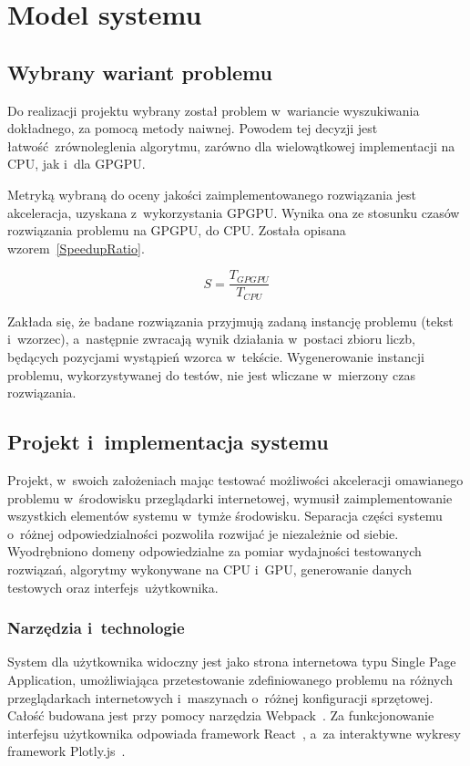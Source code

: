 
\section{Model systemu}

\subsection{Wybrany wariant problemu}

Do realizacji projektu wybrany został problem w~wariancie wyszukiwania dokładnego, za pomocą metody naiwnej. Powodem tej decyzji jest łatwość zrównoleglenia algorytmu, zarówno dla wielowątkowej implementacji na CPU, jak i~dla GPGPU.

Metryką wybraną do oceny jakości zaimplementowanego rozwiązania jest akceleracja, uzyskana z~wykorzystania GPGPU. Wynika ona ze stosunku czasów rozwiązania problemu na GPGPU, do CPU. Została opisana wzorem~\ref{SpeedupRatio}.

\begin{equation}
    \label{SpeedupRatio}
    S=\frac{T_{GPGPU}}{T_{CPU}}
\end{equation}

Zakłada się, że badane rozwiązania przyjmują zadaną instancję problemu (tekst i~wzorzec), a~następnie zwracają wynik działania w~postaci zbioru liczb, będących pozycjami wystąpień wzorca w~tekście. Wygenerowanie instancji problemu, wykorzystywanej do testów, nie jest wliczane w~mierzony czas rozwiązania.

\subsection{Projekt i~implementacja systemu}

Projekt, w~swoich założeniach mając testować możliwości akceleracji omawianego problemu w~środowisku przeglądarki internetowej, wymusił zaimplementowanie wszystkich elementów systemu w~tymże środowisku. Separacja części systemu o~różnej odpowiedzialności pozwoliła rozwijać je niezależnie od siebie.
Wyodrębniono domeny odpowiedzialne za pomiar wydajności testowanych rozwiązań, algorytmy wykonywane na CPU i~GPU, generowanie danych testowych oraz \mbox{interfejs użytkownika.}

\subsubsection{Narzędzia i~technologie}

System dla użytkownika widoczny jest jako strona internetowa typu Single Page Application, umożliwiająca przetestowanie zdefiniowanego problemu na różnych przeglądarkach internetowych i~maszynach o~różnej konfiguracji sprzętowej. Całość budowana jest przy pomocy narzędzia Webpack~\cite{Webpack}. Za funkcjonowanie interfejsu użytkownika odpowiada framework React~\cite{React}, a~za interaktywne wykresy framework Plotly.js~\cite{Plotly}.

